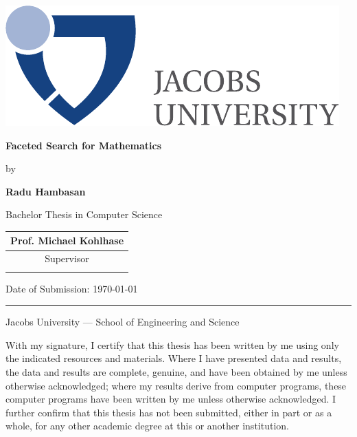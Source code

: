 \documentclass[a4paper,oneside]{article}
\newcommand{\myname}{Radu Hambasan}
\newcommand{\mytitle}{Faceted Search for Mathematics}
\newcommand{\mysupervisor}{Prof. Michael Kohlhase}
\begin{document}

\thispagestyle{empty}

\begin{flushright}
    \includegraphics[scale=0.7]{img/jub-logo}
\end{flushright}
\vspace{20mm}
\begin{center}
    \huge
    \textbf{\mytitle}
\end{center}
\vspace*{4mm}
\begin{center}
    \Large by
\end{center}
\vspace*{4mm}
\begin{center}
    \Large
    \textbf{\myname}
\end{center}
\vspace*{20mm}
\begin{center}
    \large
    Bachelor Thesis in Computer Science
\end{center}
\vfill
\begin{flushright}
    \large
    \begin{tabular}{c}
        \mysupervisor \\
        \hline
        Supervisor \\
        \\
    \end{tabular}
\end{flushright}
\vspace*{8mm}
\begin{flushleft}
    \large
    Date of Submission: \today \\
    \rule{\textwidth}{1pt}
\end{flushleft}
\begin{center}
    \Large Jacobs University --- School of Engineering and Science
\end{center}

\newpage
\thispagestyle{empty}

With my signature, I certify that this thesis has been written by me using
only the indicated resources and materials. Where I have presented data and
results, the data and results are complete, genuine, and have been obtained by
me unless otherwise acknowledged; where my results derive from computer
programs, these computer programs have been written by me unless otherwise
acknowledged. I further confirm that this thesis has not been submitted, either
in part or as a whole, for any other academic degree at this or another
institution.
\end{document}
